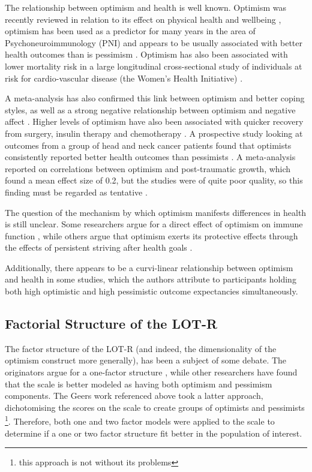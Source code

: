 \documentclass{article}
\begin{document}
The relationship between optimism and health is well known. 
Optimism was recently reviewed in relation to its 
effect on physical health and wellbeing \cite{Carver2010}, 
optimism has been used as a predictor for many years in the area of Psychoneuroimmunology (PNI)
and appears to be usually associated with better health outcomes than
is pessimism \cite{Baker2007} \cite{Conway2008}. Optimism has also
been associated with lower mortality risk in a large longitudinal
cross-sectional study of individuals at risk for cardio-vascular disease
(the Women's Health Initiative) \cite{Tindle2009}. 

A meta-analysis
has also confirmed this link between optimism and better coping styles,
as well as a strong negative relationship between optimism and negative
affect \cite{andersson1996benefits,Segerstrom2006}. Higher levels
of optimism have also been associated with quicker recovery from surgery,
insulin therapy and chemotherapy \cite{Allison2000}. A prospective
study looking at outcomes from a group of head and neck cancer patients
found that optimists consistently reported better health outcomes
than pessimists \cite{Allison2000}. A meta-analysis reported on correlations
between optimism and post-traumatic growth, which found a mean effect
size of 0.2, but the studies were of quite poor quality, so this finding
must be regarded as tentative \cite{Bostock2009}.

The question of the mechanism by which optimism manifests differences
in health is still unclear. Some researchers argue for a direct effect
of optimism on immune function ,  while others
argue that optimism exerts its protective effects through the effects
of persistent striving after health goals \cite{Segerstrom2003}.

Additionally, there appears to be a curvi-linear relationship between optimism and health in some studies, which the authors attribute to participants holding both high optimistic and high pessimistic outcome expectancies simultaneously. 

\subsection{Factorial Structure of the LOT-R}
\label{sec:fact-struct-lot}

The factor structure of the LOT-R (and indeed, the dimensionality of the optimism construct more generally), has been a subject of some debate. The originators argue for a one-factor structure \cite{Carver2010}\cite{Scheier1994}, while other researchers have found that the scale is better modeled as having both optimism and pessimism components. The Geers work referenced above took a latter approach, dichotomising the scores on the scale to create groups of optimists and pessimists \footnote{this approach is not without its problems}. Therefore, both one and two factor models were applied to the scale to determine if a one or two factor structure fit better in the population of interest. 
\end{document}
